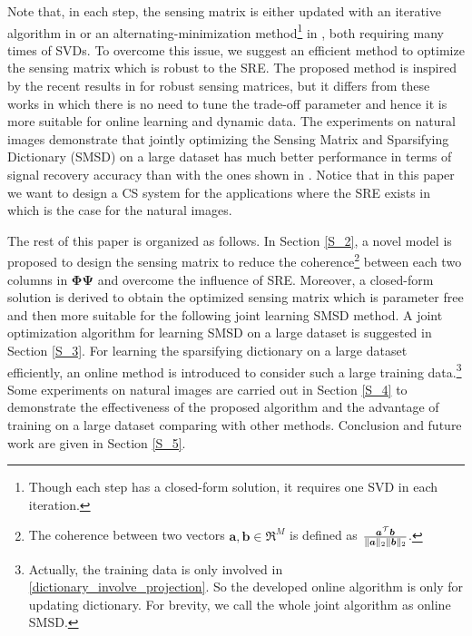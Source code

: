\documentclass[final,5p,times,twocolumn]{elsarticle}
\begin{document}
Note that, in each step, the sensing matrix is either updated with an iterative algorithm in \cite{DCS09} or an alternating-minimization method\footnote{Though each step has a closed-form solution, it requires one SVD in each iteration.} in \cite{BLLLJC15}, both requiring many times of SVDs. To overcome this issue, we suggest an efficient method to optimize the sensing matrix which is robust to the SRE. The proposed method is inspired by the recent results in \cite{LLLBJH15,HBLZ16,TZ16} for robust sensing matrices, but it differs from these works in which there is no need to tune the trade-off parameter and hence it is more suitable for online learning and dynamic data. The experiments on natural images demonstrate that jointly optimizing the Sensing Matrix and Sparsifying Dictionary (SMSD) on a large dataset has much better performance in terms of signal recovery accuracy than with the ones shown in \cite{DCS09,BLLLJC15}. {Notice that in this paper we want to design a CS system for the applications where the SRE exists in which is the case for the natural images.} %

The rest of this paper is organized as follows.  In Section \ref{S_2}, a novel model is proposed to design the sensing matrix to reduce the coherence\footnote{The coherence between two vectors $\bm a, \bm b \in\Re^{M}$ is defined as $\frac{\bm a^{\cal T}\bm b}{\|\bm a\|_2 \|\bm b\|_2}$.}  between each two columns in $\bm\Phi\bm\Psi$  and overcome the influence of SRE. Moreover, a closed-form solution is derived to obtain the optimized sensing matrix which is parameter free and then more suitable for the following joint learning SMSD method. A joint optimization algorithm for learning SMSD on a large dataset is suggested in Section \ref{S_3}. For learning the sparsifying dictionary on a large dataset efficiently, an online method is introduced to consider such a large training data.\footnote{Actually, the training data is only involved in \eqref{dictionary_involve_projection}. So the developed online algorithm is only for updating dictionary. For brevity, we call the whole joint algorithm as online SMSD.} Some experiments on natural images are carried out in Section \ref{S_4} to demonstrate the effectiveness of the proposed algorithm and the advantage of training on a large dataset comparing with other methods. Conclusion and future work are given in Section \ref{S_5}.
\end{document}
